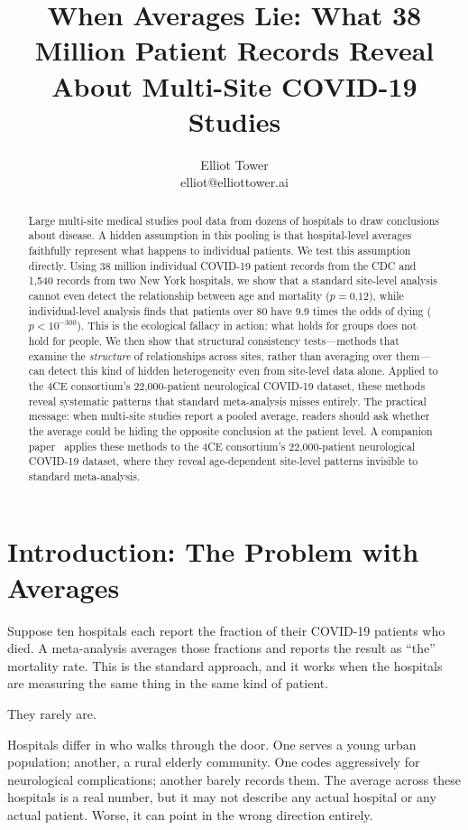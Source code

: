 \documentclass{article}
\title{When Averages Lie: What 38 Million Patient Records Reveal\\About Multi-Site COVID-19 Studies}
\author{\name Elliot Tower \\
      \email elliot@elliottower.ai}
\begin{document}
\maketitle

\begin{abstract}
Large multi-site medical studies pool data from dozens of hospitals to draw
conclusions about disease.  A hidden assumption in this pooling is that
hospital-level averages faithfully represent what happens to individual
patients.  We test this assumption directly.  Using 38 million individual
COVID-19 patient records from the CDC and 1,540 records from two New York
hospitals, we show that a standard site-level analysis cannot even detect the
relationship between age and mortality ($p = 0.12$), while individual-level
analysis finds that patients over 80 have 9.9 times the odds of dying ($p <
10^{-300}$).  This is the ecological fallacy in action: what holds for groups
does not hold for people.  We then show that structural consistency
tests---methods that examine the \emph{structure} of relationships across
sites, rather than averaging over them---can detect this kind of hidden
heterogeneity even from site-level data alone.  Applied to the 4CE
consortium's 22,000-patient neurological COVID-19 dataset, these methods
reveal systematic patterns that standard meta-analysis misses entirely.  The
practical message: when multi-site studies report a pooled average, readers
should ask whether the average could be hiding the opposite conclusion at the
patient level.  A companion paper~\cite{tower2026sitelevel} applies these methods to the 4CE consortium's 22,000-patient neurological COVID-19 dataset, where they reveal age-dependent site-level patterns invisible to standard meta-analysis.
\end{abstract}


\section{Introduction: The Problem with Averages}

Suppose ten hospitals each report the fraction of their COVID-19 patients who
died.  A meta-analysis averages those fractions and reports the result as
``the'' mortality rate.  This is the standard approach, and it works when the
hospitals are measuring the same thing in the same kind of patient.

They rarely are.

Hospitals differ in who walks through the door.  One serves a young urban
population; another, a rural elderly community.  One codes aggressively for
neurological complications; another barely records them.  The average across
these hospitals is a real number, but it may not describe any actual hospital
or any actual patient.  Worse, it can point in the wrong direction entirely.
\end{document}
